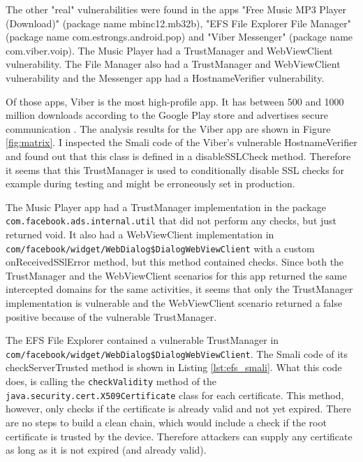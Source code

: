 \documentclass[draft,final]{vutinfth} %
\begin{document}
The other "real" vulnerabilities were found in the apps "Free Music MP3 Player (Download)" (package name mbinc12.mb32b), "EFS File Explorer File Manager" (package name com.estrongs.android.pop) and "Viber Messenger" (package name com.viber.voip). The Music Player had a TrustManager and WebViewClient vulnerability. The File Manager also had a TrustManager and WebViewClient vulnerability and the Messenger app had a HostnameVerifier vulnerability.

Of those apps, Viber is the most high-profile app. It has between 500 and 1000 million downloads according to the Google Play store and advertises secure communication \cite{Viber}. The analysis results for the Viber app are shown in Figure \ref{fig:matrix}. I inspected the Smali code of the Viber's vulnerable HostnameVerifier and found out that this class is defined in a disableSSLCheck method. Therefore it seems that this TrustManager is used to conditionally disable SSL checks for example during testing and might be erroneously set in production.

The Music Player app had a TrustManager implementation in the package \texttt{com.face\-book.ads.internal.util} that did not perform any checks, but just returned void. It also had a WebViewClient implementation in \texttt{com/facebook/widget/WebDialog\-\$DialogWebViewClient} with a custom onReceivedSSlError method, but this method contained checks. Since both the TrustManager and the WebViewClient scenarios for this app returned the same intercepted domains for the same activities, it seems that only the TrustManager implementation is vulnerable and the WebViewClient scenario returned a false positive because of the vulnerable TrustManager.

The EFS File Explorer contained a vulnerable TrustManager in \texttt{com/facebook/\-widget/WebDialog\$DialogWebViewClient}. The Smali code of its checkServerTrusted method is shown in Listing \ref{lst:efs_smali}. What this code does, is calling the \texttt{checkValidity} method of the \texttt{java.security.cert.X509Certificate} class for each certificate. This method, however, only checks if the certificate is already valid and not yet expired. There are no steps to build a clean chain, which would include a check if the root certificate is trusted by the device. Therefore attackers can supply any certificate as long as it is not expired (and already valid).
\end{document}
